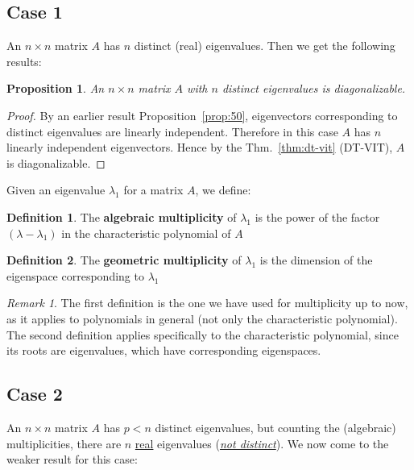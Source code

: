 \documentclass[]{extarticle}
\theoremstyle{Simple}
\newtheorem{prop}[thm]{Proposition}
\theoremstyle{definition}
\newtheorem{defn}{Definition}[section]
\theoremstyle{remark}
\newtheorem*{rem}{Remark}
\theoremstyle{example}
\begin{document}
\subsection{Case 1}
An $n \times n$ matrix $A$ has $n$ distinct (real) eigenvalues. Then we get the following results:

\begin{prop}
An $n \times n$ matrix $A$ with $n$ distinct eigenvalues is diagonalizable.
\end{prop}

\begin{proof}
By an earlier result Proposition~\ref{prop:50}, eigenvectors corresponding to distinct eigenvalues are linearly independent. Therefore in this case $A$ has $n$ linearly independent eigenvectors. Hence by the Thm.~\ref{thm:dt-vit} (DT-VIT), $A$ is diagonalizable.
\end{proof}

Given an eigenvalue $\lambda_{1}$ for a matrix $A$, we define:

\begin{defn}
The \textbf{algebraic multiplicity} of $\lambda_{1}$ is the power of the factor $(\lambda - \lambda_{1})$ in the characteristic polynomial of $A$
\end{defn}

\begin{defn}
The \textbf{geometric multiplicity} of $\lambda_{1}$ is the dimension of the eigenspace corresponding to $\lambda_{1}$
\end{defn}

\begin{rem}
The first definition is the one we have used for
multiplicity up to now, as it applies to polynomials in
general (not only the characteristic polynomial). The
second definition applies specifically to the characteristic
polynomial, since its roots are eigenvalues, which have
corresponding eigenspaces.
\end{rem}

\subsection{Case 2}
An $n \times n$ matrix $A$ has $p < n$ distinct eigenvalues, but counting the (algebraic) multiplicities, there are $n$ \underline{real} eigenvalues (\textit{\underline{not distinct}}). We now come to the weaker result for this case:
\end{document}
